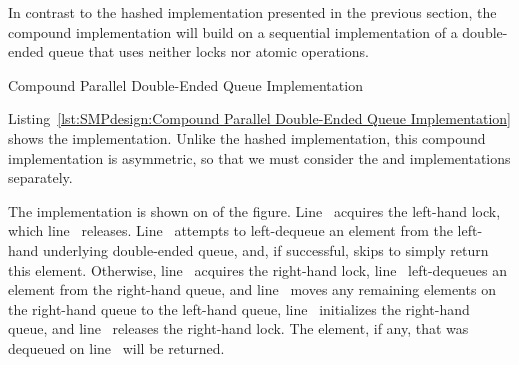 In contrast to the hashed implementation presented in
the previous section, the compound implementation will build on
a sequential implementation of a double-ended queue that uses
neither locks nor atomic operations.

\begin{listing}[tbp]

\caption{Compound Parallel Double-Ended Queue Implementation}
\label{lst:SMPdesign:Compound Parallel Double-Ended Queue Implementation}
\end{listing}

Listing~\ref{lst:SMPdesign:Compound Parallel Double-Ended Queue Implementation}
shows the implementation.
Unlike the hashed implementation, this compound implementation is
asymmetric, so that we must consider the 
and  implementations separately.

\QuickQuizEnd

\begin{fcvref}
The  implementation is shown on
of the figure.
Line~ acquires the left-hand lock,
which line~ releases.
Line~ attempts to left-dequeue an element
from the left-hand underlying
double-ended queue, and, if successful,
skips  to simply
return this element.
Otherwise, line~ acquires the right-hand lock, line~
left-dequeues an element from the right-hand queue,
and line~ moves any remaining elements on the right-hand
queue to the left-hand queue, line~ initializes
the right-hand queue,
and line~ releases the right-hand lock.
The element, if any, that was dequeued on line~ will be returned.
\end{fcvref}

